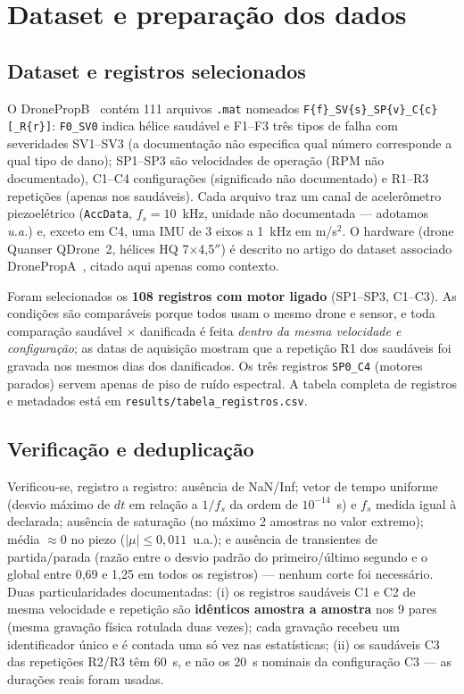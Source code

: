 \documentclass[conference]{IEEEtran}
\begin{document}
\section{Dataset e preparação dos dados}

\subsection{Dataset e registros selecionados}
O DronePropB~\cite{dronepropb} contém 111 arquivos \texttt{.mat} nomeados \texttt{F\{f\}\_SV\{s\}\_SP\{v\}\_C\{c\}[\_R\{r\}]}: \texttt{F0\_SV0} indica hélice saudável e F1--F3 três tipos de falha com severidades SV1--SV3 (a documentação não especifica qual número corresponde a qual tipo de dano); SP1--SP3 são velocidades de operação (RPM não documentado), C1--C4 configurações (significado não documentado) e R1--R3 repetições (apenas nos saudáveis). Cada arquivo traz um canal de acelerômetro piezoelétrico (\texttt{AccData}, $f_s = 10$~kHz, unidade não documentada --- adotamos \emph{u.a.}) e, exceto em C4, uma IMU de 3 eixos a 1~kHz em m/s$^2$. O hardware (drone Quanser QDrone~2, hélices HQ 7$\times$4,5$''$) é descrito no artigo do dataset associado DronePropA~\cite{droneprop_a}, citado aqui apenas como contexto.

Foram selecionados os \textbf{108 registros com motor ligado} (SP1--SP3, C1--C3). As condições são comparáveis porque todos usam o mesmo drone e sensor, e toda comparação saudável $\times$ danificada é feita \emph{dentro da mesma velocidade e configuração}; as datas de aquisição mostram que a repetição R1 dos saudáveis foi gravada nos mesmos dias dos danificados. Os três registros \texttt{SP0\_C4} (motores parados) servem apenas de piso de ruído espectral. A tabela completa de registros e metadados está em \texttt{results/tabela\_registros.csv}.

\subsection{Verificação e deduplicação}
Verificou-se, registro a registro: ausência de NaN/Inf; vetor de tempo uniforme (desvio máximo de $dt$ em relação a $1/f_s$ da ordem de $10^{-14}$~s) e $f_s$ medida igual à declarada; ausência de saturação (no máximo 2 amostras no valor extremo); média $\approx 0$ no piezo ($|\mu| \le 0{,}011$~u.a.); e ausência de transientes de partida/parada (razão entre o desvio padrão do primeiro/último segundo e o global entre 0,69 e 1,25 em todos os registros) --- nenhum corte foi necessário. Duas particularidades documentadas: (i) os registros saudáveis C1 e C2 de mesma velocidade e repetição são \textbf{idênticos amostra a amostra} nos 9 pares (mesma gravação física rotulada duas vezes); cada gravação recebeu um identificador único e é contada uma só vez nas estatísticas; (ii) os saudáveis C3 das repetições R2/R3 têm 60~s, e não os 20~s nominais da configuração C3 --- as durações reais foram usadas.
\end{document}
